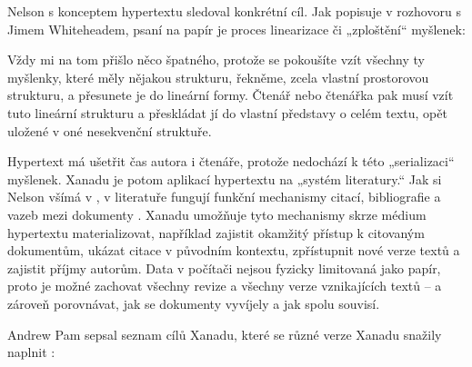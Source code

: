 Nelson s konceptem hypertextu sledoval konkrétní cíl. Jak popisuje v rozhovoru s Jimem Whiteheadem, psaní na papír je proces linearizace či „zploštění“ myšlenek:

\begin{quoted}{\autocite[Rozhovor s Nelsonem podle][]{Whitehead1996}}
Vždy mi na tom přišlo něco špatného, protože se pokoušíte vzít všechny ty myšlenky, které měly nějakou strukturu, řekněme, zcela vlastní prostorovou strukturu, a přesunete je do lineární formy. Čtenář nebo čtenářka pak musí vzít tuto lineární strukturu a přeskládat jí do vlastní představy o celém textu, opět uložené v oné nesekvenční struktuře.
\end{quoted}

Hypertext má ušetřit čas autora i čtenáře, protože nedochází k této „serializaci“ myšlenek. Xanadu je potom aplikací hypertextu na „systém literatury.“ Jak si Nelson všímá v , v literatuře fungují funkční mechanismy citací, bibliografie a vazeb mezi dokumenty \autocite[2/11]{LitMachines}. Xanadu umožňuje tyto mechanismy skrze médium hypertextu materializovat, například zajistit okamžitý přístup k citovaným dokumentům, ukázat citace v původním kontextu, zpřístupnit nové verze textů a zajistit příjmy autorům. Data v počítači nejsou fyzicky limitovaná jako papír, proto je možné zachovat všechny revize a všechny verze vznikajících textů -- a zároveň porovnávat, jak se dokumenty vyvíjely a jak spolu souvisí.

\label{p:xana:goals}
Andrew Pam sepsal seznam cílů Xanadu, které se různé verze Xanadu snažily naplnit \autocite[2]{XanaFAQ}:

